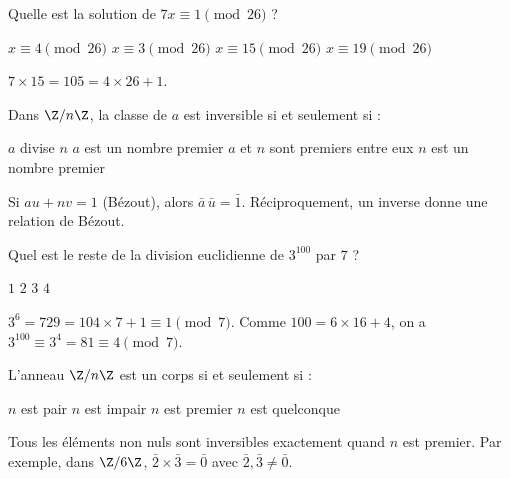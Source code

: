 \begin{question}
Quelle est la solution de $7x\equiv 1\pmod{26}$ ?
\begin{reponses}
  \mauvaise $x\equiv 4\pmod{26}$
  \mauvaise $x\equiv 3\pmod{26}$
  \bonne $x\equiv 15\pmod{26}$
  \mauvaise $x\equiv 19\pmod{26}$
\end{reponses}
\begin{explication}
$7\times15=105=4\times26+1$.
\end{explication}
\end{question}

\begin{question}
Dans $\Z/n\Z$, la classe de $a$ est inversible si et seulement si :
\begin{reponses}
  \mauvaise $a$ divise $n$
  \mauvaise $a$ est un nombre premier
  \bonne $a$ et $n$ sont premiers entre eux
  \mauvaise $n$ est un nombre premier
\end{reponses}
\begin{explication}
Si $au+nv=1$ (Bézout), alors $\bar a\,\bar u=\bar 1$. Réciproquement, un inverse donne une relation de Bézout.
\end{explication}
\end{question}

\begin{question}
Quel est le reste de la division euclidienne de $3^{100}$ par $7$ ?
\begin{reponses}
  \mauvaise $1$
  \mauvaise $2$
  \mauvaise $3$
  \bonne $4$
\end{reponses}
\begin{explication}
$3^6=729=104\times7+1\equiv1\pmod 7$. Comme $100=6\times16+4$, on a $3^{100}\equiv3^4=81\equiv4\pmod 7$.
\end{explication}
\end{question}

\begin{question}
L'anneau $\Z/n\Z$ est un corps si et seulement si :
\begin{reponses}
  \mauvaise $n$ est pair
  \mauvaise $n$ est impair
  \bonne $n$ est premier
  \mauvaise $n$ est quelconque
\end{reponses}
\begin{explication}
Tous les éléments non nuls sont inversibles exactement quand $n$ est premier. Par exemple, dans $\Z/6\Z$, $\bar2\times\bar3=\bar0$ avec $\bar2,\bar3\ne\bar0$.
\end{explication}
\end{question}

